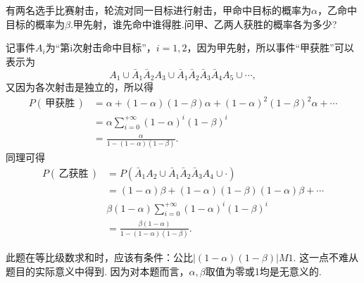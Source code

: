 \begin{example}
    有两名选手比赛射击，轮流对同一目标进行射击，甲命中目标的概率为$\alpha$，乙命中目标的概率为$\beta$.甲先射，谁先命中谁得胜.问甲、乙两人获胜的概率各为多少?
\end{example}
\begin{solution}
    记事件$A_i$为“第i次射击命中目标”，$i=1,2$，因为甲先射，所以事件“甲获胜”可以表示为
    \[
        A_1 \cup \bar A_1\bar A_2 A_3 \cup \bar A_1\bar A_2
        \bar A_3\bar A_4A_5\cup\cdots,
    \]
    又因为各次射击是独立的，所以得
    \begin{align*}
        P(\,\text{甲获胜}\,) & = \alpha + (1-\alpha)(1-\beta)\alpha + (1-\alpha)^2(1-\beta)^2\alpha + \cdots \\
                             & = \alpha\sum_{i=0}^{+\infty}(1-\alpha)^i(1-\beta)^i                           \\
                             & = \frac{\alpha}{1-(1-\alpha)(1-\beta)}.
    \end{align*}
    同理可得
    \begin{align*}
        P(\,\text{乙获胜}\,) & = P (\bar A_1A_2\cup \bar A_1\bar A_2\bar A_3A_4\cup\cdot)      \\
                             & = (1-\alpha)\beta + (1-\alpha)(1-\beta)(1-\alpha)\beta + \cdots \\
                             & \beta (1-\alpha)\sum_{i=0}^{+\infty}(1-\alpha)^i(1-\beta)^i     \\
                             & = \frac{\beta(1-\alpha)}{1-(1-\alpha)(1-\beta)}.
    \end{align*}
\end{solution}

此题在等比级数求和时，应该有条件：公比$|(1-\alpha)(1-\beta)|M1$. 这一点不难从题目的实际意义中得到. 因为对本题而言，$\alpha,\beta$取值为零或1均是无意义的.

